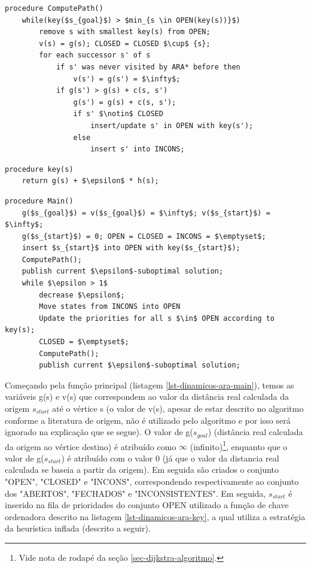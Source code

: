 \begin{lstlisting}[mathescape, label=lst-dinamicos-ara-computepath, caption=Algoritmo ARA* - função de cálculo de caminho, float=htpb]
procedure ComputePath()
	while(key($s_{goal}$) > $min_{s \in OPEN(key(s))}$)
		remove s with smallest key(s) from OPEN;
		v(s) = g(s); CLOSED = CLOSED $\cup$ {s};
		for each successor s' of s
			if s' was never visited by ARA* before then
				v(s') = g(s') = $\infty$;
			if g(s') > g(s) + c(s, s')
				g(s') = g(s) + c(s, s');
				if s' $\notin$ CLOSED
					insert/update s' in OPEN with key(s');
				else
					insert s' into INCONS;
\end{lstlisting}

 
\begin{lstlisting}[mathescape, label=lst-dinamicos-ara-key, caption=Algoritmo ARA* - função da chave ordenadora da fila de prioridades, float=htpb]
procedure key(s)
	return g(s) + $\epsilon$ * h(s);
\end{lstlisting}

\begin{lstlisting}[mathescape, label=lst-dinamicos-ara-main, caption=Algoritmo ARA* - função principal, float=htpb]
procedure Main()
	g($s_{goal}$) = v($s_{goal}$) = $\infty$; v($s_{start}$) = $\infty$;
	g($s_{start}$) = 0; OPEN = CLOSED = INCONS = $\emptyset$;
	insert $s_{start}$ into OPEN with key($s_{start}$);
	ComputePath();
	publish current $\epsilon$-suboptimal solution;
	while $\epsilon > 1$
		decrease $\epsilon$;
		Move states from INCONS into OPEN
		Update the priorities for all s $\in$ OPEN according to key(s);
		CLOSED = $\emptyset$;
		ComputePath();
		publish current $\epsilon$-suboptimal solution;
\end{lstlisting}

Começando pela função principal (listagem \ref{lst-dinamicos-ara-main}), temos as variáveis g(s) e v(s) que correspondem ao valor da distância real calculada da origem $s_{start}$ até o vértice s (o valor de v(s), apesar de estar descrito no algoritmo conforme a literatura de origem, não é utilizado pelo algoritmo e por isso será ignorado na explicação que se segue). O valor de g($s_{goal}$) (distância real calculada da origem ao vértice destino) é atribuído como $\infty$ (infinito)\footnote{Vide nota de rodapé da seção \ref{sec-dijkstra-algoritmo}.}, enquanto que o valor de g($s_{start}$) é atribuído com o valor 0 (já que o valor da distancia real calculada se baseia a partir da origem). Em seguida são criados o conjunto "OPEN", "CLOSED" e "INCONS", correspondendo respectivamente ao conjunto dos "ABERTOS", "FECHADOS" e "INCONSISTENTES". Em seguida, $s_{start}$ é inserido na fila de prioridades do conjunto OPEN utilizado a função de chave ordenadora descrito na listagem \ref{lst-dinamicos-ara-key}, a qual utiliza a estratégia da heurística inflada (descrito a seguir).

